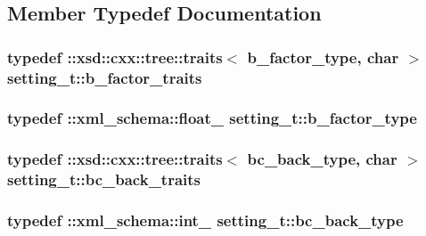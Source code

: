 \subsection{Member Typedef Documentation}
\subsubsection[{\texorpdfstring{b\+\_\+factor\+\_\+traits}{b_factor_traits}}]{\setlength{\rightskip}{0pt plus 5cm}typedef \+::xsd\+::cxx\+::tree\+::traits$<$ {\bf b\+\_\+factor\+\_\+type}, char $>$ {\bf setting\+\_\+t\+::b\+\_\+factor\+\_\+traits}}\hypertarget{classsetting__t_a537558160cc066cde0fb14b74062cbf4}{}\label{classsetting__t_a537558160cc066cde0fb14b74062cbf4}
\subsubsection[{\texorpdfstring{b\+\_\+factor\+\_\+type}{b_factor_type}}]{\setlength{\rightskip}{0pt plus 5cm}typedef \+::{\bf xml\+\_\+schema\+::float\+\_\+} {\bf setting\+\_\+t\+::b\+\_\+factor\+\_\+type}}\hypertarget{classsetting__t_afd5541e25ce3565005acb9c70bddda2d}{}\label{classsetting__t_afd5541e25ce3565005acb9c70bddda2d}
\subsubsection[{\texorpdfstring{bc\+\_\+back\+\_\+traits}{bc_back_traits}}]{\setlength{\rightskip}{0pt plus 5cm}typedef \+::xsd\+::cxx\+::tree\+::traits$<$ {\bf bc\+\_\+back\+\_\+type}, char $>$ {\bf setting\+\_\+t\+::bc\+\_\+back\+\_\+traits}}\hypertarget{classsetting__t_a5edb994d60080ec2324d0bfaec5d017f}{}\label{classsetting__t_a5edb994d60080ec2324d0bfaec5d017f}
\subsubsection[{\texorpdfstring{bc\+\_\+back\+\_\+type}{bc_back_type}}]{\setlength{\rightskip}{0pt plus 5cm}typedef \+::{\bf xml\+\_\+schema\+::int\+\_\+} {\bf setting\+\_\+t\+::bc\+\_\+back\+\_\+type}}\hypertarget{classsetting__t_a5deb32969da7832b53abbf0564142627}{}\label{classsetting__t_a5deb32969da7832b53abbf0564142627}
